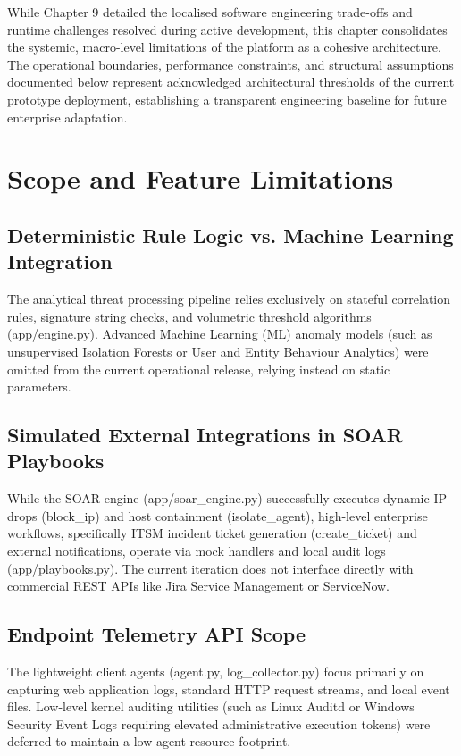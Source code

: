 While Chapter 9 detailed the localised software engineering trade-offs and runtime challenges resolved during active development, this chapter consolidates the systemic, macro-level limitations of the platform as a cohesive architecture. The operational boundaries, performance constraints, and structural assumptions documented below represent acknowledged architectural thresholds of the current prototype deployment, establishing a transparent engineering baseline for future enterprise adaptation.

\section{Scope and Feature Limitations}

\subsection{Deterministic Rule Logic vs. Machine Learning Integration}

The analytical threat processing pipeline relies exclusively on stateful correlation rules, signature string checks, and volumetric threshold algorithms (app/engine.py). Advanced Machine Learning (ML) anomaly models (such as unsupervised Isolation Forests or User and Entity Behaviour Analytics) were omitted from the current operational release, relying instead on static parameters.

\subsection{Simulated External Integrations in SOAR Playbooks}

While the SOAR engine (app/soar\_engine.py) successfully executes dynamic IP drops (block\_ip) and host containment (isolate\_agent), high-level enterprise workflows, specifically ITSM incident ticket generation (create\_ticket) and external notifications, operate via mock handlers and local audit logs (app/playbooks.py). The current iteration does not interface directly with commercial REST APIs like Jira Service Management or ServiceNow.

\subsection{Endpoint Telemetry API Scope}

The lightweight client agents (agent.py, log\_collector.py) focus primarily on capturing web application logs, standard HTTP request streams, and local event files. Low-level kernel auditing utilities (such as Linux Auditd or Windows Security Event Logs requiring elevated administrative execution tokens) were deferred to maintain a low agent resource footprint.

